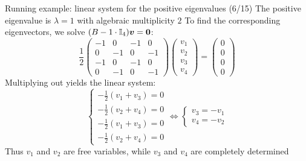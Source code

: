 \documentclass[aspectratio=169]{beamer}\usepackage[]{graphicx}\usepackage[]{xcolor}
\begin{document}
\begin{frame}{Running example: linear system for the positive eigenvalues (6/15)}
The positive eigenvalue is $\lambda = 1$ with algebraic multiplicity $2$
\vfill
To find the corresponding eigenvectors, we solve $(B - 1\cdot\II_4)\bv = \b0$:
\[
\frac{1}{2}\begin{pmatrix}
-1 & 0 & -1 & 0 \\
0 & -1 & 0 & -1 \\
-1 & 0 & -1 & 0 \\
0 & -1 & 0 & -1
\end{pmatrix}
\begin{pmatrix} v_1 \\ v_2 \\ v_3 \\ v_4 \end{pmatrix} = \begin{pmatrix} 0 \\ 0 \\ 0 \\ 0 \end{pmatrix}
\]
\vfill
Multiplying out yields the linear system:
\[
\begin{cases}
-\frac{1}{2}(v_1 + v_3) = 0 \\
-\frac{1}{2}(v_2 + v_4) = 0 \\
-\frac{1}{2}(v_1 + v_3) = 0 \\
-\frac{1}{2}(v_2 + v_4) = 0
\end{cases}
\iff
\begin{cases}
v_3 = -v_1 \\
v_4 = -v_2
\end{cases}
\]
\vfill
Thus $v_1$ and $v_2$ are free variables, while $v_3$ and $v_4$ are completely determined
\end{frame}
\end{document}
